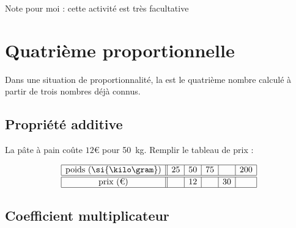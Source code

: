 Note pour moi : cette activité est très facultative 

 

\section{Quatrième proportionnelle}

\begin{definition}
    Dans une situation de proportionnalité, la  est le quatrième nombre calculé à partir de trois nombres déjà connus.
\end{definition}

\subsection{Propriété additive}

\clearpage

La pâte à pain coûte \( 12\)€ pour \SI{50}{\kilo\gram}. Remplir le tableau de prix :

\begin{equation*}
    \begin{array}[]{|c||c|c|c|c|c|}
        \hline
        \text{poids (\si{\kilo\gram})}&25&50&75&&200\\
        \hline\hline
        \text{prix (€)}&&12&&30&\\
        \hline
    \end{array}
\end{equation*}

\clearpage

\subsection{Coefficient multiplicateur}

